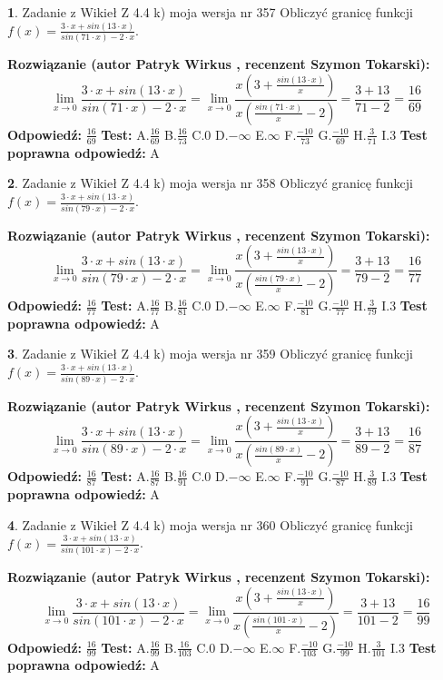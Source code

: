 \documentclass[12pt, a4paper]{article}
\theoremstyle{definition} %
\newtheorem{zad}{}
\newcommand{\zadStart}[1]{\begin{zad}#1\newline}
\newcommand{\zadStop}{\end{zad}}
\newcommand{\rozwStart}[2]{\noindent \textbf{Rozwiązanie (autor #1 , recenzent #2): }\newline}
\newcommand{\rozwStop}{\newline}
\newcommand{\odpStart}{\noindent \textbf{Odpowiedź:}\newline}
\newcommand{\odpStop}{\newline}
\newcommand{\testStart}{\noindent \textbf{Test:}\newline}
\newcommand{\testStop}{\newline}
\newcommand{\kluczStart}{\noindent \textbf{Test poprawna odpowiedź:}\newline}
\newcommand{\kluczStop}{\newline}
\begin{document}
\zadStart{Zadanie z Wikieł Z 4.4 k) moja wersja nr 357}
Obliczyć granicę funkcji $f(x)=\frac{3\cdot x +sin(13\cdot x)}{sin(71\cdot x) -2\cdot x}$.
\zadStop
\rozwStart{Patryk Wirkus}{Szymon Tokarski}
$$\lim\limits_{x\to 0}\frac{3\cdot x +sin(13\cdot x)}{sin(71\cdot x) -2\cdot x}
=\lim\limits_{x\to 0}\frac{x(3+\frac{sin(13\cdot x)}{x})}{x(\frac{sin(71\cdot x)}{x}-2)}
=\frac{3+13}{71-2} = \frac{16}{69}$$
\rozwStop
\odpStart
$\frac{16}{69}$
\odpStop
\testStart
A.$\frac{16}{69}$
B.$\frac{16}{73}$
C.$0$
D.$-\infty$
E.$\infty$
F.$\frac{-10}{73}$
G.$\frac{-10}{69}$
H.$\frac{3}{71}$
I.$3$
\testStop
\kluczStart
A
\kluczStop



\zadStart{Zadanie z Wikieł Z 4.4 k) moja wersja nr 358}
Obliczyć granicę funkcji $f(x)=\frac{3\cdot x +sin(13\cdot x)}{sin(79\cdot x) -2\cdot x}$.
\zadStop
\rozwStart{Patryk Wirkus}{Szymon Tokarski}
$$\lim\limits_{x\to 0}\frac{3\cdot x +sin(13\cdot x)}{sin(79\cdot x) -2\cdot x}
=\lim\limits_{x\to 0}\frac{x(3+\frac{sin(13\cdot x)}{x})}{x(\frac{sin(79\cdot x)}{x}-2)}
=\frac{3+13}{79-2} = \frac{16}{77}$$
\rozwStop
\odpStart
$\frac{16}{77}$
\odpStop
\testStart
A.$\frac{16}{77}$
B.$\frac{16}{81}$
C.$0$
D.$-\infty$
E.$\infty$
F.$\frac{-10}{81}$
G.$\frac{-10}{77}$
H.$\frac{3}{79}$
I.$3$
\testStop
\kluczStart
A
\kluczStop



\zadStart{Zadanie z Wikieł Z 4.4 k) moja wersja nr 359}
Obliczyć granicę funkcji $f(x)=\frac{3\cdot x +sin(13\cdot x)}{sin(89\cdot x) -2\cdot x}$.
\zadStop
\rozwStart{Patryk Wirkus}{Szymon Tokarski}
$$\lim\limits_{x\to 0}\frac{3\cdot x +sin(13\cdot x)}{sin(89\cdot x) -2\cdot x}
=\lim\limits_{x\to 0}\frac{x(3+\frac{sin(13\cdot x)}{x})}{x(\frac{sin(89\cdot x)}{x}-2)}
=\frac{3+13}{89-2} = \frac{16}{87}$$
\rozwStop
\odpStart
$\frac{16}{87}$
\odpStop
\testStart
A.$\frac{16}{87}$
B.$\frac{16}{91}$
C.$0$
D.$-\infty$
E.$\infty$
F.$\frac{-10}{91}$
G.$\frac{-10}{87}$
H.$\frac{3}{89}$
I.$3$
\testStop
\kluczStart
A
\kluczStop



\zadStart{Zadanie z Wikieł Z 4.4 k) moja wersja nr 360}
Obliczyć granicę funkcji $f(x)=\frac{3\cdot x +sin(13\cdot x)}{sin(101\cdot x) -2\cdot x}$.
\zadStop
\rozwStart{Patryk Wirkus}{Szymon Tokarski}
$$\lim\limits_{x\to 0}\frac{3\cdot x +sin(13\cdot x)}{sin(101\cdot x) -2\cdot x}
=\lim\limits_{x\to 0}\frac{x(3+\frac{sin(13\cdot x)}{x})}{x(\frac{sin(101\cdot x)}{x}-2)}
=\frac{3+13}{101-2} = \frac{16}{99}$$
\rozwStop
\odpStart
$\frac{16}{99}$
\odpStop
\testStart
A.$\frac{16}{99}$
B.$\frac{16}{103}$
C.$0$
D.$-\infty$
E.$\infty$
F.$\frac{-10}{103}$
G.$\frac{-10}{99}$
H.$\frac{3}{101}$
I.$3$
\testStop
\kluczStart
A
\kluczStop
\end{document}
